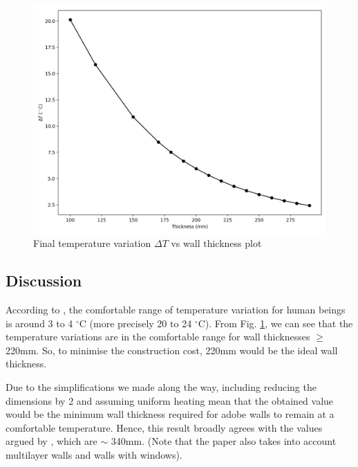\begin{figure}[H]
    \centering
    \includegraphics[width=0.6\linewidth]{Figures/4/var_fin.png}
    \caption{Final temperature variation $\Delta T$ vs  wall thickness plot}
    \label{var_fin}
\end{figure}

\subsection{Discussion}
According to \cite{public-health-england-2013}, the comfortable range of temperature variation for human beings is around 3 to 4 $^\circ$C (more precisely 20 to 24 $^\circ$C). From Fig. \ref{var_fin}, we can see that the temperature variations are in the comfortable range for wall thicknesses $\ge$ 220mm. So, to minimise the construction cost, 220mm would be the ideal wall thickness. 

Due to the simplifications we made along the way, including reducing the dimensions by 2 and assuming uniform heating mean that the obtained value would be the minimum wall thickness required for adobe walls to remain at a comfortable temperature. Hence, this result broadly agrees with the values argued by \cite{parra-saldivar-2005}, which are $\sim$ 340mm. (Note that the paper also takes into account multilayer walls and walls with windows). 